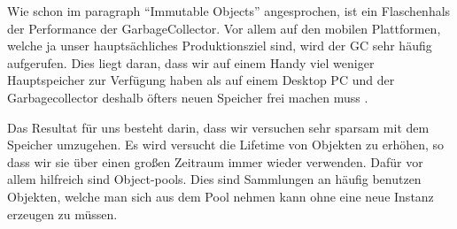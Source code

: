 
Wie schon im paragraph ``Immutable Objects'' angesprochen, ist ein Flaschenhals der Performance der GarbageCollector.
Vor allem auf den mobilen Plattformen, welche ja unser hauptsächliches Produktionsziel sind, wird der GC sehr häufig aufgerufen. Dies liegt daran, dass wir auf einem Handy viel weniger Hauptspeicher zur Verfügung haben als auf einem Desktop PC und der Garbagecollector deshalb öfters neuen Speicher frei machen muss .


Das Resultat für uns besteht darin, dass wir versuchen sehr sparsam mit dem Speicher umzugehen. Es wird versucht die Lifetime von Objekten zu erhöhen, so dass wir sie über einen großen Zeitraum immer wieder verwenden. Dafür vor allem hilfreich sind Object-pools. Dies sind Sammlungen an häufig benutzen Objekten, welche man sich aus dem Pool nehmen kann ohne eine neue Instanz erzeugen zu müssen.